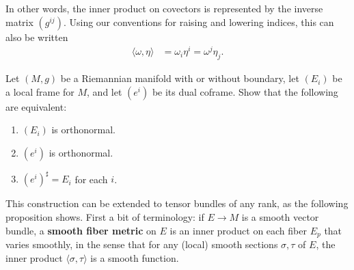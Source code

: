 In other words, the inner product on covectors is represented by the inverse matrix $(g^{ij})$. Using our conventions for raising and lowering indices, this can also be written
\begin{align*}
\langle\omega, \eta\rangle &= \omega_i\eta^i = \omega^j\eta_j.
\end{align*}

\begin{exercise}
\label{exer:orthonormal-frames-and-coframes}
\leanok
{}
Let $(M, g)$ be a Riemannian manifold with or without boundary, let $(E_i)$ be a local frame for $M$, and let $(e^i)$ be its dual coframe. Show that the following are equivalent:
\begin{enumerate}
\item[(a)] $(E_i)$ is orthonormal.
\item[(b)] $(e^i)$ is orthonormal.
\item[(c)] $(e^i)^{\sharp} = E_i$ for each $i$.
\end{enumerate}
\end{exercise}

This construction can be extended to tensor bundles of any rank, as the following proposition shows. First a bit of terminology: if $E \to M$ is a smooth vector bundle, a \textbf{smooth fiber metric} on $E$ is an inner product on each fiber $E_p$ that varies smoothly, in the sense that for any (local) smooth sections $\sigma, \tau$ of $E$, the inner product $\langle\sigma, \tau\rangle$ is a smooth function.

